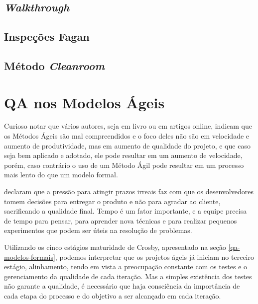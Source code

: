 \documentclass[
	12pt,				%
	openright,			%
	oneside,			%
	a4paper,			%
	english,			%
	brazil,				%
	]{abntex2}
\begin{document}
\subsection{\emph{Walkthrough}}


\subsection{Inspeções Fagan}


\subsection{Método \emph{Cleanroom}}

\section{QA nos Modelos Ágeis}


Curioso notar que vários autores, seja em livro ou em artigos online, indicam que os Métodos Ágeis são mal compreendidos e o foco deles não são em velocidade e aumento de produtividade, mas em aumento de qualidade do projeto, e que caso seja bem aplicado e adotado, ele pode resultar em um aumento de velocidade, porém, caso contrário o uso de um Método Ágil pode resultar em um processo mais lento do que um modelo formal. \cite{galen2015} %

 declaram que a pressão para atingir prazos irreais faz com que os desenvolvedores tomem decisões para entregar o produto e não para agradar ao cliente, sacrificando a qualidade final. Tempo é um fator importante, e a equipe precisa de tempo para pensar, para aprender nova técnicas e para realizar pequenos experimentos que podem ser úteis na resolução de problemas.

Utilizando os cinco estágios maturidade de Crosby, apresentado na seção \autoref{qa-modelos-formais}, podemos interpretar que os projetos ágeis já iniciam no terceiro estágio, alinhamento, tendo em vista a preocupação constante com os testes e o gerenciamento da qualidade de cada iteração. Mas a simples existência dos testes não garante a qualidade, é necessário que haja consciência da importância de cada etapa do processo e do objetivo a ser alcançado em cada iteração.
\end{document}
